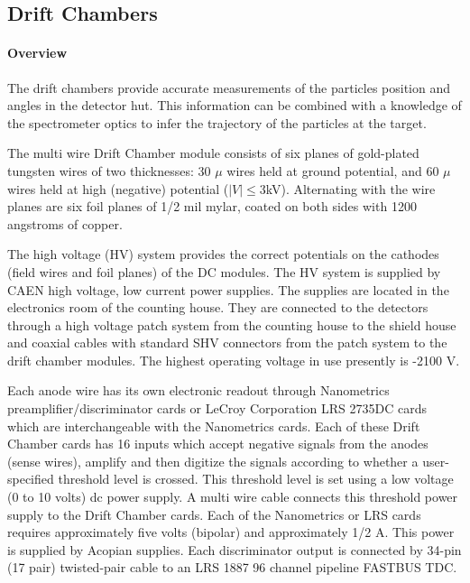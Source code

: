 \subsection{Drift Chambers}

\paragraph{Overview}

The drift chambers provide accurate measurements of the particles
position and angles in the detector hut. This information can be combined
with a knowledge of the spectrometer optics to infer the trajectory of the
particles at the target.

The multi wire Drift Chamber module consists of six planes of gold-plated
tungsten wires of two thicknesses: 30 $\mu$ wires held at ground
potential, and 60 $\mu$ wires held at high (negative) potential
($\left|V\right|\le3$kV).  Alternating with the wire planes are six
foil planes of 1/2 mil mylar, coated on both sides with 1200 angstroms
of copper.

The high voltage (HV) system provides the correct potentials on the
cathodes (field wires and foil planes) of the DC modules.  The HV
system is supplied by CAEN high voltage, low current power supplies.
The supplies are located in the electronics room of the counting
house. They are connected to the detectors through a high voltage patch
system from the counting house to the shield house
and coaxial cables with standard SHV connectors from the patch system
to the drift chamber modules.
The highest operating voltage in use presently is -2100 V.

Each anode wire has its own electronic readout through
Nanometrics preamplifier/discriminator
cards or LeCroy Corporation LRS 2735DC cards which are interchangeable
with the Nanometrics cards.  Each of these Drift Chamber cards has 16 inputs
which accept negative signals from the anodes (sense wires), amplify
and then digitize the signals according to whether a user-specified
threshold level is crossed.  This threshold level is set using a low
voltage (0 to 10 volts) dc power supply.  A
multi wire cable connects this threshold power supply to the Drift Chamber cards.
Each of the Nanometrics or LRS cards requires approximately five volts
(bipolar) and approximately 1/2 A.  This power is supplied by Acopian
supplies.  Each discriminator
output is connected by 34-pin (17 pair) twisted-pair cable to an LRS
1887 96 channel pipeline FASTBUS TDC.

